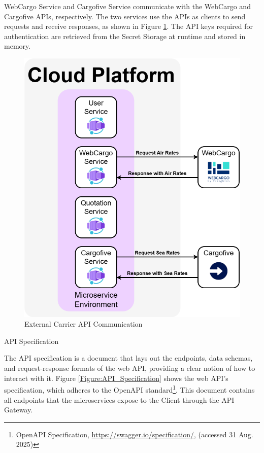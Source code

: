 \documentclass[12pt,reqno, oneside]{amsbook}
\makeatletter
\def\section{\@startsection{section}{1}%
      \z@{.5\linespacing\@plus.7\linespacing}{.25\linespacing}%
      {\normalfont\bfseries\flushleft}}
\theoremstyle{definition}
\theoremstyle{definition}
\numberwithin{section}{chapter}
\numberwithin{table}{chapter}
\numberwithin{figure}{chapter}
\makeatother
\begin{document}
WebCargo Service and Cargofive Service communicate with the WebCargo and Cargofive \acp{API}, respectively. The two services use the \acp{API} as clients to send requests and receive responses, as shown in Figure \ref{Figure:ExternalCarrierAPICommunication}. The \ac{API} keys required for authentication are retrieved from the Secret Storage at runtime and stored in memory.

\begin{figure}[H]
  \centering
  \includegraphics[width=0.9\linewidth]{images/ExternalCarrierAPICommunication.png}
  \caption{\label{Figure:ExternalCarrierAPICommunication}External Carrier \ac{API} Communication}
\end{figure}

\pagebreak

\section{\texorpdfstring{\ac{API}}{API} Specification}
\label{Section:API_Specification}

The \ac{API} specification is a document that lays out the endpoints, data schemas, and request-response formats of the web \ac{API}, providing a clear notion of how to interact with it. Figure \ref{Figure:API_Specification} shows the web \ac{API}'s specification, which adheres to the OpenAPI standard\footnote{OpenAPI Specification, \url{https://swagger.io/specification/}, (accessed 31 Aug. 2025)}. This document contains all endpoints that the microservices expose to the Client through the \ac{API} Gateway.
\end{document}
